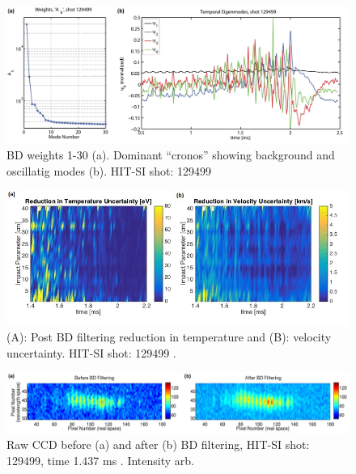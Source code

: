 \begin{center}
\begin{figure}
\includegraphics[width=6in]{BDWeight_1}\caption{BD weights 1-30 (a). Dominant ``cronos'' showing background and oscillatig modes (b). HIT-SI shot: 129499 \cite{hossack2015study}}\label{BD Weight}
\end{figure}

\begin{figure}
\includegraphics[width=6in]{BD_Uncertainty_1}\caption{(A): Post BD filtering reduction in temperature and (B): velocity uncertainty. HIT-SI shot: 129499 \cite{hossack2015study}.}\label{BD Uncertainty}
\end{figure}
\begin{figure}
\includegraphics[width=6in]{CCD_BD_1}\caption{Raw CCD before (a) and after (b) BD filtering, HIT-SI shot: 129499, time 1.437 ms \cite{hossack2015study}. Intensity arb.}\label{BD CCD}


\end{figure}
\end{center}
